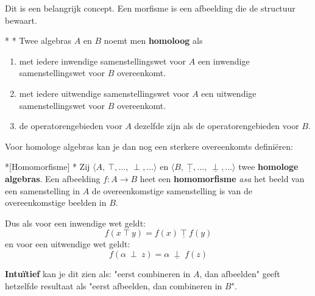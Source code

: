 Dit is een belangrijk concept. Een morfisme is een afbeelding die de structuur bewaart.

\begin{nicedefinition}*
    \nextpart[]*
    Twee algebras $A$ en $B$ noemt men \textcolor{PineGreen!75!black}{\textbf{homoloog}} als
    \begin{enumerate}
        \item met iedere inwendige samenstellingswet voor $A$ een inwendige samenstellingswet voor $B$ overeenkomt.
        \item met iedere uitwendige samenstellingswet voor $A$ een uitwendige samenstellingswet voor $B$ overeenkomt.
        \item de operatorengebieden voor $A$ dezelfde zijn als de operatorengebieden voor $B$.
    \end{enumerate}
\end{nicedefinition}

Voor homologe algebras kan je dan nog een sterkere overeenkomts definiëren:

\begin{nicedefinition}*[Homomorfisme]
    \nextpart[]*
    Zij $\langle A,\ \top,\dots,\ \perp,\dots \rangle$ en $\langle B,\ \underline{\top}, \dots,\ \underline{\perp}, \dots  \rangle$ twee \textbf{homologe algebras}. Een afbeelding $f : A \to B$ heet een \textcolor{PineGreen!75!black}{\textbf{homomorfisme}} \emph{asa} het beeld van een samenstelling in $A$ de overeenkomstige samenstelling is van de overeenkomstige beelden in $B$.

    Dus als voor een inwendige wet geldt:
    \begin{equation*}
        f(x\ \top\ y) = f(x)\ \underline{\top}\ f(y)
    \end{equation*}
    en voor een uitwendige wet geldt:
    \begin{equation*}
        f(\alpha\ \perp\ z) = \alpha\ \underline{\perp}\ f(z)
    \end{equation*}
\end{nicedefinition}

\textbf{Intuïtief} kan je dit zien als: "eerst combineren in $A$, dan afbeelden" geeft hetzelfde resultaat als "eerst afbeelden, dan combineren in $B$".

\begin{center}
\resizebox{0.99\textwidth}{!}{%
    
}
\end{center}


